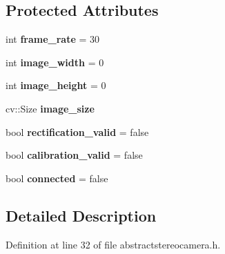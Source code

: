 \subsection*{Protected Attributes}
\begin{DoxyCompactItemize}
\item 
\hypertarget{class_abstract_stereo_camera_ae7facc8693fc536cd62d0c3513f65ae1}{}int {\bfseries frame\+\_\+rate} = 30\label{class_abstract_stereo_camera_ae7facc8693fc536cd62d0c3513f65ae1}

\item 
\hypertarget{class_abstract_stereo_camera_a31d42714c8aafc3708051752bac5266a}{}int {\bfseries image\+\_\+width} = 0\label{class_abstract_stereo_camera_a31d42714c8aafc3708051752bac5266a}

\item 
\hypertarget{class_abstract_stereo_camera_a3b63f57eb44274ec09b6854e0ac4c831}{}int {\bfseries image\+\_\+height} = 0\label{class_abstract_stereo_camera_a3b63f57eb44274ec09b6854e0ac4c831}

\item 
\hypertarget{class_abstract_stereo_camera_a3194fe3b665c6ad61a2cdf0e56b9d58a}{}cv\+::\+Size {\bfseries image\+\_\+size}\label{class_abstract_stereo_camera_a3194fe3b665c6ad61a2cdf0e56b9d58a}

\item 
\hypertarget{class_abstract_stereo_camera_a2c916eeb832136104dfa3cd625966b28}{}bool {\bfseries rectification\+\_\+valid} = false\label{class_abstract_stereo_camera_a2c916eeb832136104dfa3cd625966b28}

\item 
\hypertarget{class_abstract_stereo_camera_aba9b93d70b25aef90dd5f00a0f00ca8a}{}bool {\bfseries calibration\+\_\+valid} = false\label{class_abstract_stereo_camera_aba9b93d70b25aef90dd5f00a0f00ca8a}

\item 
\hypertarget{class_abstract_stereo_camera_aa91b2dff7505fca206087c9559a0625b}{}bool {\bfseries connected} = false\label{class_abstract_stereo_camera_aa91b2dff7505fca206087c9559a0625b}

\end{DoxyCompactItemize}


\subsection{Detailed Description}


Definition at line 32 of file abstractstereocamera.\+h.



